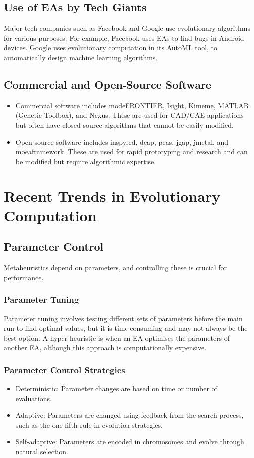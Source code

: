 \subsection*{Use of EAs by Tech Giants}
Major tech companies such as Facebook and Google use evolutionary algorithms for various purposes. For example, Facebook uses EAs to find bugs in Android devices. Google uses evolutionary computation in its AutoML tool, to automatically design machine learning algorithms.

\subsection*{Commercial and Open-Source Software}
\begin{itemize}
    \item  Commercial software includes modeFRONTIER, Isight, Kimeme, MATLAB (Genetic Toolbox), and Nexus. These are used for CAD/CAE applications but often have closed-source algorithms that cannot be easily modified.
    \item Open-source software includes inspyred, deap, peas, jgap, jmetal, and moeaframework. These are used for rapid prototyping and research and can be modified but require algorithmic expertise.
\end{itemize}

\section{Recent Trends in Evolutionary Computation}
\subsection*{Parameter Control}
Metaheuristics depend on parameters, and controlling these is crucial for performance.
\subsubsection*{Parameter Tuning}
Parameter tuning involves testing different sets of parameters before the main run to find optimal values, but it is time-consuming and may not always be the best option. A hyper-heuristic is when an EA optimises the parameters of another EA, although this approach is computationally expensive.
\subsubsection*{Parameter Control Strategies}
\begin{itemize}
    \item Deterministic: Parameter changes are based on time or number of evaluations.
    \item Adaptive: Parameters are changed using feedback from the search process, such as the one-fifth rule in evolution strategies.
    \item Self-adaptive: Parameters are encoded in chromosomes and evolve through natural selection.
\end{itemize}

